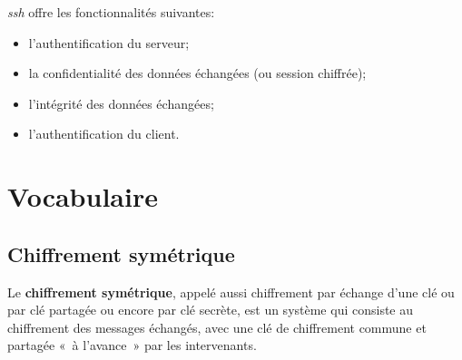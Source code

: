 \documentclass[a4paper,11pt]{article}
\begin{document}
\emph{ssh} offre les fonctionnalités suivantes:

\begin{itemize}
	\item l'authentification du serveur;
	\item la confidentialité des données échangées (ou session chiffrée);
	\item l'intégrité des données échangées;
	\item l'authentification du client.
\end{itemize}



\section{Vocabulaire}
\label{vocabulaire}

\secttoc

\subsection{Chiffrement symétrique}
\label{chiffrement-symétrique}

Le \textbf{chiffrement symétrique}, appelé aussi chiffrement par échange
d'une clé ou par clé partagée ou encore par clé secrète, est un système
qui consiste au chiffrement des messages échangés, avec une clé de
chiffrement commune et partagée «~à l'avance~» par les intervenants.

\begin{center}
\end{center}
\vspace{2cm}
\end{document}
